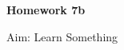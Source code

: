 \documentclass{article}
\begin{document}

{\LARGE \textbf{Homework 7b}}

{\small Aim: Learn Something}
	
	\hlinepagewidth
	
\end{document}
